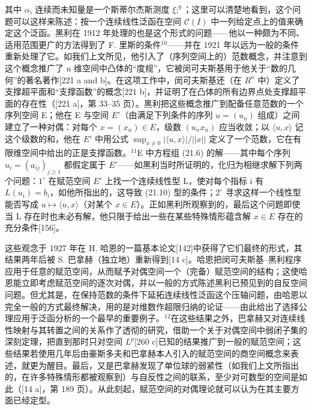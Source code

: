 其中 \(\alpha_{i}\) 连续而未知量是一个斯蒂尔杰斯测度 \(\xi;^{9}\)；这里可以清楚地看到，这个问题可以这样来陈述：按一个连续线性泛函在空间 \(\mathcal{C}(I)\) 中一列给定点上的值来确定这个泛函。黑利在 1912 年处理的也是这个形式的问题——他以一种颇为不同、适用范围更广的方法得到了 F. 里斯的条件\(^{10}\)——并在 1921 年以远为一般的条件重新处理了它。如我们上文所见，他引入了（序列空间上的）范数概念，并注意到这个概念推广了 n 维空间中凸体的“度规”，它被闵可夫斯基用于他关于“数的几何”的著名著作{[}221 a and b{]}。在这项工作中，闵可夫斯基还（在 \(R^{n}\) 中）定义了支撑超平面和“支撑函数”的概念{[}221 b{]}，并证明了在凸体的所有边界点处支撑超平面的存在性（{[}221 a{]}，第 33–35 页）。黑利把这些概念推广到配备任意范数的一个序列空间 E；他在 E 与空间 \(E'\)（由满足下列条件的序列 \(u = (u_n)\) 组成）之间建立了一种对偶：对每个 \(x = (x_n) \in E\)，级数 \((u_n x_n)\) 应当收敛；以 \(\langle u, x \rangle\) 记这个级数的和，他在 \(E'\) 中用公式 \(\sup_{x \neq 0} |\langle u, x \rangle| / ||x||\) 定义了一个范数，它在有限维空间中给出的正是支撑函数。\(^{11}\)E 中方程组 (21.6) 的解——其中每个序列 \(u_i = (a_{ij})_{j \geq 1}\) 都假定属于 \(E'\)——如黑利当时所证明的，化归为相继求解下列两个问题：\(1^\circ\) 在赋范空间 \(E'\) 上找一个连续线性型 L，使对每个指标 i 有 \(L(u_i) = b_i\)，如他所指出的，这导致 (21.10) 型的条件；\(2^\circ\) 寻求这样一个线性型能否写成 \(u \mapsto \langle u, x \rangle\)（对某个 \(x \in E\)）。正如黑利所观察到的，最后这个问题即使当 L 存在时也未必有解，他只限于给出一些在某些特殊情形蕴含解 \(x \in E\) 存在的充分条件{[}156{]}。

这些观念于 1927 年在 H. 哈恩的一篇基本论文{[}142{]}中获得了它们最终的形式，其结果两年后被 S. 巴拿赫（独立地）重新得到{[}14 c{]}。哈恩把闵可夫斯基–黑利程序应用于任意的赋范空间，从而赋予对偶空间一个（完备）赋范空间的结构；这使哈恩能立即考虑赋范空间的逐次对偶，并以一般的方式陈述黑利已预见到的自反空间问题。但尤其是，在保持范数的条件下延拓连续线性泛函这个压轴问题，由哈恩以完全一般的方式最终解决，用的是对维数作超限归纳的论证——由此给出了选择公理应用于泛函分析的一个最早的重要例子。\(^{12}\)在这些结果之外，巴拿赫又对连续线性映射与其转置之间的关系作了透彻的研究，借助一个关于对偶空间中弱闭子集的深刻定理，把直到那时只对空间 \(L^{p}\){[}260 c{]}已知的结果推广到一般的赋范空间；这些结果若使用几年后由豪斯多夫和巴拿赫本人引入的赋范空间的商空间概念来表述，就更为醒目。最后，又是巴拿赫发现了单位球的弱紧性（如我们上文所指出的，在许多特殊情形都被观察到）与自反性之间的联系，至少对可数型的空间是如此（{[}14 a{]}，第 189 页）。从此刻起，赋范空间的对偶理论就可以认为在其主要方面已经定型。

